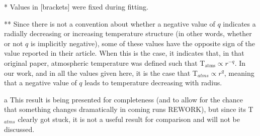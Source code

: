 \begin{table}[ht!]
\begin{threeparttable}
\begin{tabular}{l l l c c c }
      \bottomrule
    \end{tabular}
    \begin{tablenotes}\footnotesize
      \item[*] Values in [brackets] were fixed during fitting.
      \item[**] Since there is not a convention about whether a negative value of $q$ indicates a radially decreasing or increasing temperature structure (in other words, whether or not $q$ is implicitly negative), some of these values have the opposite sign of the value reported in their article. When this is the case, it indicates that, in that original paper, atmospheric temperature was defined such that T$_\text{atms} \propto r^{-q}$. In our work, and in all the values given here, it is the case that T$_{atms} \propto r^{q}$, meaning that a negative value of $q$ leads to temperature decreasing with radius.
      \item[a] This result is being presented for completeness (and to allow for the chance that something changes dramatically in coming runs REWORK), but since its T$_{atms}$ clearly got stuck, it is not a useful result for comparison and will not be discussed.

\end{tablenotes}
\end{threeparttable}
\end{table}
